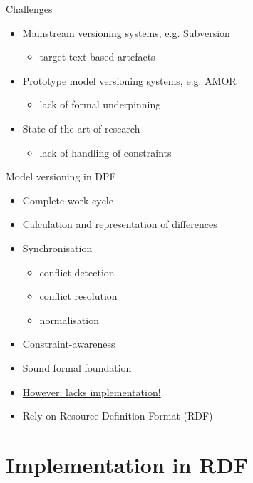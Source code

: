 \documentclass[dvips,slidetop,mathserif,red]{beamer}
\begin{document}
\begin{frame}{Challenges}
  \begin{itemize}
    \item Mainstream versioning systems, e.g. Subversion
    \begin{itemize}
      \item target text-based artefacts
    \end{itemize}
    \pause
    \item Prototype model versioning systems, e.g. AMOR
    \begin{itemize}
      \item lack of formal underpinning
    \end{itemize}
    \pause
    \item State-of-the-art of research
    \begin{itemize}
      \item lack of handling of constraints
    \end{itemize}
  \end{itemize}
\end{frame}

\begin{frame}{Model versioning in DPF}
  \begin{itemize}
    \item Complete work cycle
    \item Calculation and representation of differences
    \item Synchronisation
    \begin{itemize}
      \item conflict detection
      \item conflict resolution
      \item normalisation
    \end{itemize}
    \item Constraint-awareness
  \end{itemize}
  \begin{itemize}
      \item \underline{Sound formal foundation}
      \item \underline{However: lacks implementation!}
      \item \centering Rely on Resource Definition Format (RDF)
  \end{itemize}
\end{frame}


\section{Implementation in RDF}
\end{document}
